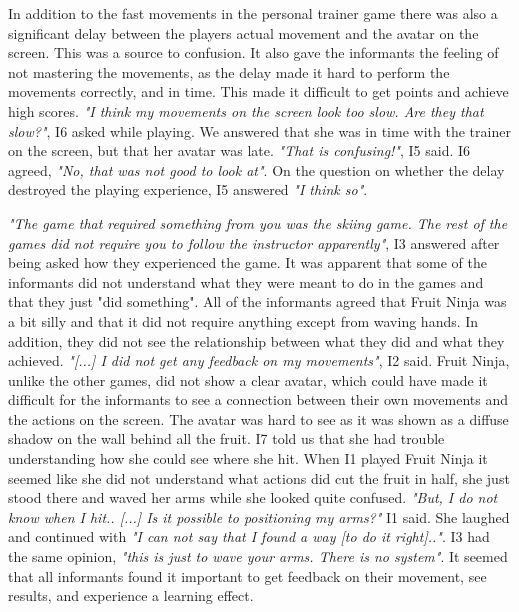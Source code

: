 In addition to the fast movements in the personal trainer game there was also a significant delay between the players actual movement and the avatar on the screen. This was a source to confusion. It also gave the informants the feeling of not mastering the movements, as the delay made it hard to perform the movements correctly, and in time. This made it difficult to get points and achieve high scores. \emph{"I think my movements on the screen look too slow. Are they that slow?"}, I6 asked while playing. We answered that she was in time with the trainer on the screen, but that her avatar was late. \emph{"That is confusing!"}, I5 said. I6 agreed, \emph{"No, that was not good to look at"}. On the question on whether the delay destroyed the playing experience, I5 answered \emph{"I think so"}.

\emph{"The game that required something from you was the skiing game. The rest of the games did not require you to follow the instructor apparently"}, I3 answered after being asked how they experienced the game. It was apparent that some of the informants did not understand what they were meant to do in the games and that they just "did something". All of the informants agreed that Fruit Ninja was a bit silly and that it did not require anything except from waving hands. In addition, they did not see the relationship between what they did and what they achieved. \emph{"[...] I did not get any feedback on my movements"}, I2 said. Fruit Ninja, unlike the other games, did not show a clear avatar, which could have made it difficult for the informants to see a connection between their own movements and the actions on the screen. The avatar was hard to see as it was shown as a diffuse shadow on the wall behind all the fruit. I7 told us that she had trouble understanding how she could see where she hit. When I1 played Fruit Ninja it seemed like she did not understand what actions did cut the fruit in half, she just stood there and waved her arms while she looked quite confused. \emph{"But, I do not know when I hit.. [...] Is it possible to positioning my arms?"} I1 said. She laughed and continued with \emph{"I can not say that I found a way [to do it right].."}. I3 had the same opinion, \emph{"this is just to wave your arms. There is no system"}. It seemed that all informants found it important to get feedback on their movement, see results, and experience a learning effect. 

